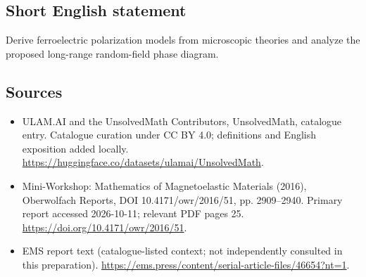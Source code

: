 \documentclass[11pt]{article}
\begin{document}
\subsection{Short English statement}
Derive ferroelectric polarization models from microscopic theories and analyze the proposed long-range random-field phase diagram.
\subsection{Sources}
\begin{itemize}
\item[\hypertarget{source:statement:1}{S1}] ULAM.AI and the UnsolvedMath Contributors, UnsolvedMath, catalogue entry. Catalogue curation under CC BY 4.0; definitions and English exposition added locally.
\url{https://huggingface.co/datasets/ulamai/UnsolvedMath}.
\item[\hypertarget{source:statement:2}{S2}] Mini-Workshop: Mathematics of Magnetoelastic Materials (2016), Oberwolfach Reports, DOI 10.4171/owr/2016/51, pp. 2909--2940. Primary report accessed 2026-10-11; relevant PDF pages 25.
\url{https://doi.org/10.4171/owr/2016/51}.
\item[\hypertarget{source:statement:3}{S3}] EMS report text (catalogue-listed context; not independently consulted in this preparation).
\url{https://ems.press/content/serial-article-files/46654?nt=1}.
\end{itemize}
\label{end:statement}
\end{document}
